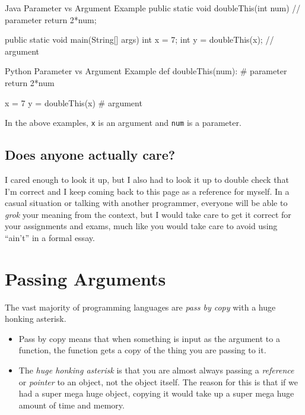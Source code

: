 \begin{javacode}{Java Parameter vs Argument Example}
public static void doubleThis(int num) {   // parameter
	return 2*num;
}

public static void main(String[] args){
	int x = 7;
	int y = doubleThis(x);  // argument
}

\end{javacode}

\begin{pycode}{Python Parameter vs Argument Example}
def doubleThis(num): # parameter
	return 2*num
		
x = 7
y = doubleThis(x) # argument
\end{pycode}

In the above examples, \texttt{x} is an argument and \texttt{num} is a parameter.


\subsection{Does anyone actually care?}

I cared enough to look it up, but I also had to look it up to double check that I'm correct and I keep coming back to this page as a reference for myself.  
In a casual situation or talking with another programmer, everyone will be able to \textit{grok} your meaning from the context, but I would take care to get it correct for your assignments and exams, much like you would take care to avoid using ``ain't'' in a formal essay.

\section{Passing Arguments}

The vast majority of programming languages are \textit{pass by copy} with a huge honking asterisk.
\begin{itemize}
	\item Pass by copy means that when something is input as the argument to a function, the function gets a copy of the thing you are passing to it.
	\item The \textit{huge honking asterisk} is that you are almost always passing a \textit{reference} or \textit{pointer} to an object, not the object itself.  The reason for this is that if we had a super mega huge object, copying it would take up a super mega huge amount of time and memory.
\end{itemize}



